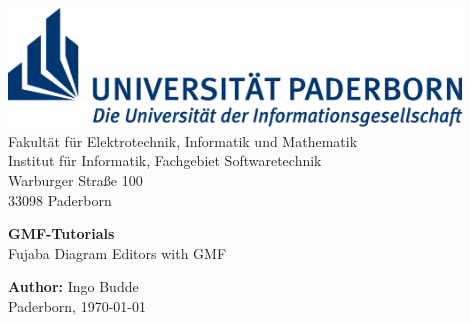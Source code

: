 \documentclass[12pt,a4paper,twoside,titlepage,headsepline,pointlessnumbers,liststotoc,idxtotoc,bibtotoc,ngerman,english]{scrartcl}
\begin{document}
                
             



	\setcounter{page}{1}

	\begin{titlepage}
	\thispagestyle{empty}
	\begin{center}

			\includegraphics[width=12cm]{figures/Logo_Uni_Paderborn}\\
			\textsf{
			Fakultät für Elektrotechnik, Informatik und Mathematik \\
			Institut für Informatik, Fachgebiet Softwaretechnik \\ 
      		Warburger Straße 100 \\
			33098 Paderborn} \\
                    
      \vspace{4cm}									

			{\LARGE  \textbf{GMF-Tutorials}} \\ 
			\vspace{0.5cm}
			{\Large Fujaba Diagram Editors with GMF} \\ 
			\vspace{2.5cm}

			\vspace{0.5cm}
			\textbf{Author:} Ingo Budde \\
			\vspace{1cm}
			Paderborn, \today \\
			\vspace{1cm}
			
	\end{center}
	\end{titlepage}

	\clearpage
		
	\thispagestyle{empty}
	
	\tableofcontents
	
	\clearpage
  
\end{document}
